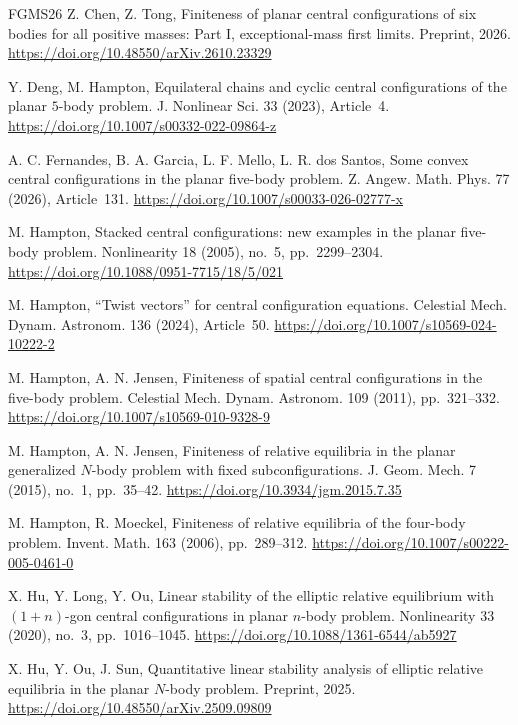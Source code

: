 \documentclass[Threeside,11pt]{article}
\theoremstyle{definition}
\theoremstyle{remark}
\numberwithin{equation}{section}
\theoremstyle{remark}
\begin{document}
\begin{thebibliography}{FGMS26}
Z. Chen, Z. Tong, 
Finiteness of planar central configurations of six bodies for all positive masses: Part I, exceptional-mass first limits. Preprint, 2026. \url{https://doi.org/10.48550/arXiv.2610.23329}




Y. Deng, M. Hampton,
Equilateral chains and cyclic central configurations of the
planar $5$-body problem.
J. Nonlinear Sci. 33 (2023), Article~4.
\url{https://doi.org/10.1007/s00332-022-09864-z}

A. C. Fernandes, B. A. Garcia, L. F. Mello, L. R. dos Santos,
Some convex central configurations in the planar five-body problem.
Z. Angew. Math. Phys. 77 (2026), Article~131.
\url{https://doi.org/10.1007/s00033-026-02777-x}

M. Hampton,
Stacked central configurations: new examples in the planar five-body problem.
Nonlinearity 18 (2005), no.~5, pp.~2299--2304.
\url{https://doi.org/10.1088/0951-7715/18/5/021}

M. Hampton,
``Twist vectors'' for central configuration equations.
Celestial Mech. Dynam. Astronom. 136 (2024), Article~50.
\url{https://doi.org/10.1007/s10569-024-10222-2}

M. Hampton, A. N. Jensen,
Finiteness of spatial central configurations in the
five-body problem.
Celestial Mech. Dynam. Astronom. 109 (2011), pp.~321--332.
\url{https://doi.org/10.1007/s10569-010-9328-9}

M. Hampton, A. N. Jensen,
Finiteness of relative equilibria in the planar generalized $N$-body
problem with fixed subconfigurations.
J. Geom. Mech. 7 (2015), no.~1, pp.~35--42.
\url{https://doi.org/10.3934/jgm.2015.7.35}

M. Hampton, R. Moeckel,
Finiteness of relative equilibria of the four-body problem.
Invent. Math. 163 (2006), pp.~289--312.
\url{https://doi.org/10.1007/s00222-005-0461-0}

X. Hu, Y. Long, Y. Ou,
Linear stability of the elliptic relative equilibrium
with $(1+n)$-gon central configurations in planar $n$-body problem.
Nonlinearity 33 (2020), no.~3, pp.~1016--1045.
\url{https://doi.org/10.1088/1361-6544/ab5927}

X. Hu, Y. Ou, J. Sun,
Quantitative linear stability analysis of elliptic
relative equilibria in the planar $N$-body problem.
Preprint, 2025.
\url{https://doi.org/10.48550/arXiv.2509.09809}


\end{thebibliography}
\end{document}
